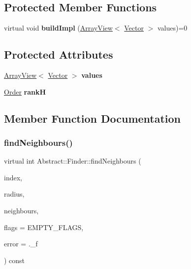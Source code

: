 \subsection*{Protected Member Functions}
\begin{DoxyCompactItemize}
\item 
\hypertarget{classAbstract_1_1Finder_a77e7ccb5cbfb025f77962e18981a5718}{}\label{classAbstract_1_1Finder_a77e7ccb5cbfb025f77962e18981a5718} 
virtual void {\bfseries build\+Impl} (\hyperlink{classArrayView}{Array\+View}$<$ \hyperlink{classBasicVector}{Vector} $>$ values)=0
\end{DoxyCompactItemize}
\subsection*{Protected Attributes}
\begin{DoxyCompactItemize}
\item 
\hypertarget{classAbstract_1_1Finder_a5bba60f9a6bafcea0f014a31516f9b33}{}\label{classAbstract_1_1Finder_a5bba60f9a6bafcea0f014a31516f9b33} 
\hyperlink{classArrayView}{Array\+View}$<$ \hyperlink{classBasicVector}{Vector} $>$ {\bfseries values}
\item 
\hypertarget{classAbstract_1_1Finder_a5fc028a6ca9d4a46569076de2fe220a2}{}\label{classAbstract_1_1Finder_a5fc028a6ca9d4a46569076de2fe220a2} 
\hyperlink{classOrder}{Order} {\bfseries rankH}
\end{DoxyCompactItemize}


\subsection{Member Function Documentation}
\hypertarget{classAbstract_1_1Finder_a7f04b92d939992d0aa2978a259b2533f}{}\label{classAbstract_1_1Finder_a7f04b92d939992d0aa2978a259b2533f} 
\subsubsection{\texorpdfstring{find\+Neighbours()}{findNeighbours()}}
{\footnotesize\ttfamily virtual int Abstract\+::\+Finder\+::find\+Neighbours (\begin{DoxyParamCaption}\item[{const int}]{index,  }\item[{const Float}]{radius,  }\item[{\hyperlink{classArray}{Array}$<$ \hyperlink{structNeighbourRecord}{Neighbour\+Record} $>$ \&}]{neighbours,  }\item[{\hyperlink{classFlags}{Flags}$<$ Finder\+Flags $>$}]{flags = {\ttfamily EMPTY\+\_\+FLAGS},  }\item[{const Float}]{error = {.\+\_\+f} }\end{DoxyParamCaption}) const\hspace{0.3cm}{\ttfamily [pure virtual]}}

